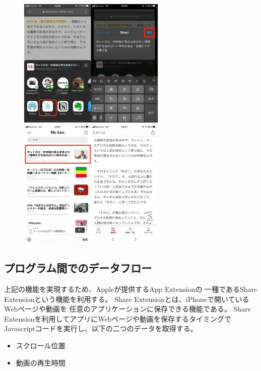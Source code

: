 \documentclass[a4j,10pt]{jsarticle}
\begin{document}
\begin{figure}[htbp]
    \begin{minipage}{0.5\hsize}
        \begin{center}
        \includegraphics[width=70mm]{../assets/scroll_position/scroll_position1.png}
        \end{center}
        \caption{}
        \label{fig:one}
    \end{minipage}
    \begin{minipage}{0.5\hsize}
        \begin{center}
        \includegraphics[width=70mm]{../assets/scroll_position/scroll_position2.png}
        \end{center}
        \caption{}
        \label{fig:two}
    \end{minipage}
\end{figure}

\subsection{プログラム間でのデータフロー}
上記の機能を実現するため、Appleが提供するApp Extension\cite{App-Extension}の
一種であるShare Extension\cite{Share-Extension}という機能を利用する。
Share Extensionとは、iPhoneで開いているWebページや動画を
任意のアプリケーションに保存できる機能である。
Share Extensionを利用してアプリにWebページや動画を保存するタイミングで
Javascriptコードを実行し、以下の二つのデータを取得する。
\begin{itemize}
\item スクロール位置
\item 動画の再生時間
\end{itemize}
\end{document}
